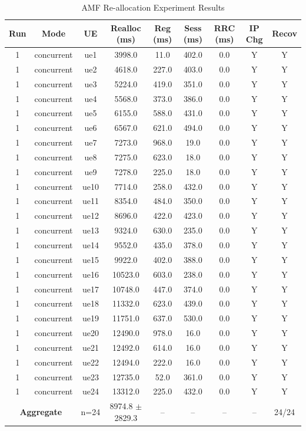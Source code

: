 \begin{table}[ht]
\centering
\begin{tabular}{|c|c|c|c|c|c|c|c|c|}
\hline
Run & Mode & UE & Realloc (ms) & Reg (ms) & Sess (ms) & RRC (ms) & IP Chg & Recov \\
\hline
1 & concurrent & ue1 & 3998.0 & 11.0 & 402.0 & 0.0 & Y & Y \\
1 & concurrent & ue2 & 4618.0 & 227.0 & 403.0 & 0.0 & Y & Y \\
1 & concurrent & ue3 & 5224.0 & 419.0 & 351.0 & 0.0 & Y & Y \\
1 & concurrent & ue4 & 5568.0 & 373.0 & 386.0 & 0.0 & Y & Y \\
1 & concurrent & ue5 & 6155.0 & 588.0 & 431.0 & 0.0 & Y & Y \\
1 & concurrent & ue6 & 6567.0 & 621.0 & 494.0 & 0.0 & Y & Y \\
1 & concurrent & ue7 & 7273.0 & 968.0 & 19.0 & 0.0 & Y & Y \\
1 & concurrent & ue8 & 7275.0 & 623.0 & 18.0 & 0.0 & Y & Y \\
1 & concurrent & ue9 & 7278.0 & 225.0 & 18.0 & 0.0 & Y & Y \\
1 & concurrent & ue10 & 7714.0 & 258.0 & 432.0 & 0.0 & Y & Y \\
1 & concurrent & ue11 & 8354.0 & 484.0 & 350.0 & 0.0 & Y & Y \\
1 & concurrent & ue12 & 8696.0 & 422.0 & 423.0 & 0.0 & Y & Y \\
1 & concurrent & ue13 & 9324.0 & 630.0 & 235.0 & 0.0 & Y & Y \\
1 & concurrent & ue14 & 9552.0 & 435.0 & 378.0 & 0.0 & Y & Y \\
1 & concurrent & ue15 & 9922.0 & 402.0 & 388.0 & 0.0 & Y & Y \\
1 & concurrent & ue16 & 10523.0 & 603.0 & 238.0 & 0.0 & Y & Y \\
1 & concurrent & ue17 & 10748.0 & 447.0 & 374.0 & 0.0 & Y & Y \\
1 & concurrent & ue18 & 11332.0 & 623.0 & 439.0 & 0.0 & Y & Y \\
1 & concurrent & ue19 & 11751.0 & 637.0 & 530.0 & 0.0 & Y & Y \\
1 & concurrent & ue20 & 12490.0 & 978.0 & 16.0 & 0.0 & Y & Y \\
1 & concurrent & ue21 & 12492.0 & 614.0 & 16.0 & 0.0 & Y & Y \\
1 & concurrent & ue22 & 12494.0 & 222.0 & 16.0 & 0.0 & Y & Y \\
1 & concurrent & ue23 & 12735.0 & 52.0 & 361.0 & 0.0 & Y & Y \\
1 & concurrent & ue24 & 13312.0 & 225.0 & 432.0 & 0.0 & Y & Y \\
\multicolumn{2}{|c|}{\textbf{Aggregate}} & n=24 & 8974.8 $\pm$ 2829.3 & -- & -- & -- & -- & 24/24 \\
\hline
\end{tabular}
\caption{AMF Re-allocation Experiment Results}
\label{tab:amf_realloc}
\end{table}
